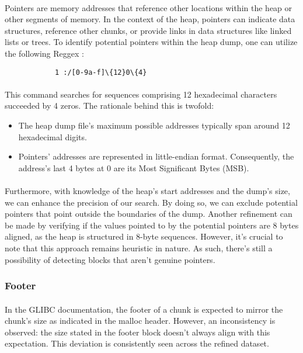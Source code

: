             \paragraph{}Pointers are memory addresses that reference other locations within the heap or other segments of memory. In the context of the heap, pointers can indicate data structures, reference other chunks, or provide links in data structures like linked lists or trees. To identify potential pointers within the heap dump, one can utilize the following Reggex :
            \begin{lstlisting}
            1 :/[0-9a-f]\{12}0\{4}
            \end{lstlisting}

            \paragraph{}This command searches for sequences comprising 12 hexadecimal characters succeeded by 4 zeros. The rationale behind this is twofold: 
            \begin{itemize}
                \item The heap dump file's maximum possible addresses typically span around 12 hexadecimal digits.
                \item Pointers' addresses are represented in little-endian format. Consequently, the address's last 4 bytes at 0 are its Most Significant Bytes (MSB).
            \end{itemize}
            \paragraph{}Furthermore, with knowledge of the heap's start addresses and the dump's size, we can enhance the precision of our search. By doing so, we can exclude potential pointers that point outside the boundaries of the dump. Another refinement can be made by verifying if the values pointed to by the potential pointers are 8 bytes aligned, as the heap is structured in 8-byte sequences. However, it's crucial to note that this approach remains heuristic in nature. As such, there's still a possibility of detecting blocks that aren't genuine pointers.
        \subsubsection{Footer}
            \paragraph{}In the GLIBC documentation, the footer of a chunk is expected to mirror the chunk's size as indicated in the malloc header. However, an inconsistency is observed: the size stated in the footer block doesn't always align with this expectation. This deviation is consistently seen across the refined dataset.
    

        

